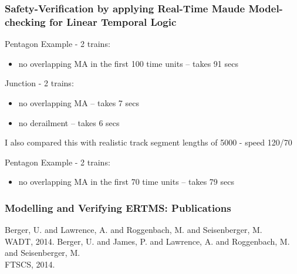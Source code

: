 \documentclass{beamer}
\begin{document}
\begin{frame}
\frametitle{Safety-Verification by applying Real-Time Maude
  Model-checking for Linear Temporal Logic}

Pentagon Example - 2 trains:
\begin{itemize}
\item
no overlapping MA in the first 100 time units
-- takes 91 secs
\end{itemize}

\bigskip


Junction - 2 trains:
\begin{itemize}
\item
no overlapping MA -- takes 7 secs

\item 
no derailment  -- takes 6 secs

\end{itemize}

\pause
\bigskip

I also compared this with realistic track segment lengths of 5000 - speed 120/70

\medskip

Pentagon Example - 2 trains:
\begin{itemize}
\item
no overlapping MA in the first 70 time units -- takes 79 secs
\end{itemize}
\end{frame}


\begin{frame}
\frametitle{Modelling and Verifying ERTMS: Publications}
 \begin{thebibliography}{10}    
  \beamertemplatearticlebibitems
{} Berger, U. and Lawrence, A. and Roggenbach, M. and Seisenberger, M.
 \\
WADT, 2014.
\medskip
{} Berger, U. and James, P. and Lawrence, A. and Roggenbach, M. and
	Seisenberger, M.
 \\
FTSCS, 2014.
\end{thebibliography}
\end{frame}
\end{document}
